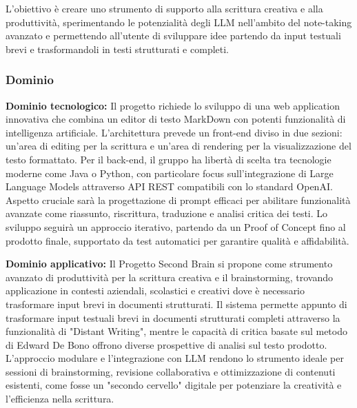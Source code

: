 \documentclass[11pt,a4paper]{article}
\begin{document}
L'obiettivo è creare uno strumento di supporto alla scrittura creativa e alla produttività, sperimentando le potenzialità degli LLM nell'ambito del note-taking avanzato e permettendo all'utente di sviluppare idee partendo da input testuali brevi e trasformandoli in testi strutturati e completi.

\subsubsection{Dominio}
\textbf{Dominio tecnologico:} Il progetto richiede lo sviluppo di una web application innovativa che combina un editor di testo MarkDown con potenti funzionalità di intelligenza artificiale. L'architettura prevede un front-end diviso in due sezioni: un'area di editing per la scrittura e un'area di rendering per la visualizzazione del testo formattato. Per il back-end, il gruppo ha libertà di scelta tra tecnologie moderne come Java o Python, con particolare focus sull'integrazione di Large Language Models attraverso API REST compatibili con lo standard OpenAI. Aspetto cruciale sarà la progettazione di prompt efficaci per abilitare funzionalità avanzate come riassunto, riscrittura, traduzione e analisi critica dei testi. Lo sviluppo seguirà un approccio iterativo, partendo da un Proof of Concept fino al prodotto finale, supportato da test automatici per garantire qualità e affidabilità.

\vspace{0.5cm}

\noindent \textbf{Dominio applicativo:} Il Progetto Second Brain si propone come strumento avanzato di produttività per la scrittura creativa e il brainstorming,  trovando applicazione in contesti aziendali, scolastici e creativi dove è necessario trasformare input brevi in documenti strutturati.
Il sistema permette appunto di trasformare input testuali brevi in documenti strutturati completi attraverso la funzionalità di "Distant Writing", mentre le capacità di critica basate sul metodo di Edward De Bono offrono diverse prospettive di analisi sul testo prodotto. L'approccio modulare e l'integrazione con LLM rendono lo strumento ideale per sessioni di brainstorming, revisione collaborativa e ottimizzazione di contenuti esistenti, come fosse un "secondo cervello" digitale per potenziare la creatività e l'efficienza nella scrittura.
\end{document}
